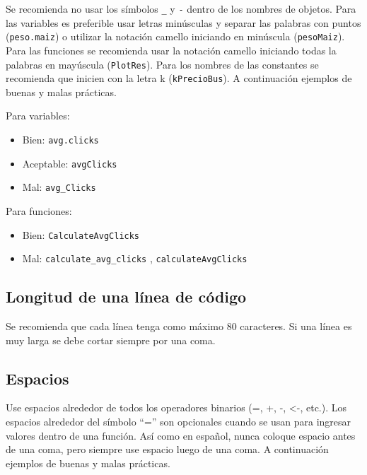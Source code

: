 \documentclass[10pt,]{krantz}
\begin{document}
Se recomienda no usar los símbolos \texttt{\_} y \texttt{-} dentro de
los nombres de objetos. Para las variables es preferible usar letras
minúsculas y separar las palabras con puntos (\texttt{peso.maiz}) o
utilizar la notación camello iniciando en minúscula (\texttt{pesoMaiz}).
Para las funciones se recomienda usar la notación camello iniciando
todas la palabras en mayúscula (\texttt{PlotRes}). Para los nombres de
las constantes se recomienda que inicien con la letra k
(\texttt{kPrecioBus}). A continuación ejemplos de buenas y malas
prácticas.

Para variables:

\begin{itemize}
    \item Bien: \verb|avg.clicks|
    \item Aceptable: \verb|avgClicks|
    \item Mal: \verb|avg_Clicks|
\end{itemize}

Para funciones:

\begin{itemize}
    \item Bien: \verb|CalculateAvgClicks| 
    \item Mal: \verb|calculate_avg_clicks| , \verb|calculateAvgClicks|
\end{itemize}

\subsection{Longitud de una línea de código}

Se recomienda que cada línea tenga como máximo 80 caracteres. Si una
línea es muy larga se debe cortar siempre por una coma.

\subsection{Espacios}

Use espacios alrededor de todos los operadores binarios (=, +, -,
\textless{}-, etc.). Los espacios alrededor del símbolo ``='' son
opcionales cuando se usan para ingresar valores dentro de una función.
Así como en español, nunca coloque espacio antes de una coma, pero
siempre use espacio luego de una coma. A continuación ejemplos de buenas
y malas prácticas.
\end{document}
